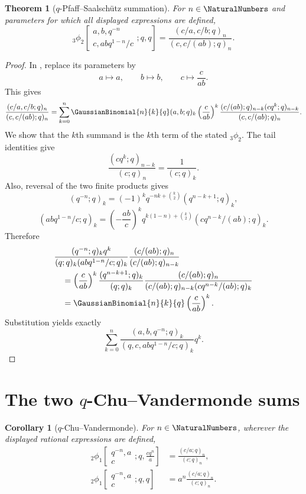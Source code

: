 \documentclass[11pt,a4paper,oneside,openany]{book}
\newtheorem{theorem}{Theorem}[chapter]
\newtheorem{corollary}[corollary]{Corollary}
\theoremstyle{definition}
\theoremstyle{remark}
\begin{document}
\begin{theorem}[$q$-Pfaff--Saalsch\"utz summation]\label{thm:q-pfaff}
For $n\in\NaturalNumbers$ and parameters for which all displayed
expressions are defined,
\[
 {}_3\phi_2\!\left[
 \begin{matrix}a,b,q^{-n}\\c,abq^{1-n}/c\end{matrix};q,q\right]
 =\frac{(c/a,c/b;q)_n}{(c,c/(ab);q)_n}.
\]
\end{theorem}

\begin{proof}
In , replace its parameters by
\[
 a\mapsto a,\qquad b\mapsto b,\qquad c\mapsto \frac{c}{ab}.
\]
This gives
\[
 \frac{(c/a,c/b;q)_n}{(c,c/(ab);q)_n}
 =\sum_{k=0}^{n}\GaussianBinomial{n}{k}{q}(a,b;q)_k
 \left(\frac{c}{ab}\right)^k
 \frac{(c/(ab);q)_{n-k}(cq^k;q)_{n-k}}
 {(c,c/(ab);q)_n}.
\]
We show that the $k$th summand is the $k$th term of the stated ${}_3\phi_2$.  The tail identities give
\[
 \frac{(cq^k;q)_{n-k}}{(c;q)_n}=\frac1{(c;q)_k}.
\]
Also, reversal of the two finite products gives
\[
 (q^{-n};q)_k
 =(-1)^kq^{-nk+\binom k2}(q^{n-k+1};q)_k,
\]
\[
 (abq^{1-n}/c;q)_k
 =\left(-\frac{ab}{c}\right)^k
 q^{k(1-n)+\binom k2}
 (cq^{n-k}/(ab);q)_k.
\]
Therefore
\begin{align*}
 &\frac{(q^{-n};q)_k q^k}{(q;q)_k(abq^{1-n}/c;q)_k}
 \frac{(c/(ab);q)_n}{(c/(ab);q)_{n-k}}\\
 &\quad=\left(\frac{c}{ab}\right)^k
 \frac{(q^{n-k+1};q)_k}{(q;q)_k}
 \frac{(c/(ab);q)_n}
 {(c/(ab);q)_{n-k}(cq^{n-k}/(ab);q)_k}\\
 &\quad=\GaussianBinomial{n}{k}{q}\left(\frac{c}{ab}\right)^k.
\end{align*}
Substitution yields exactly
\[
 \sum_{k=0}^{n}
 \frac{(a,b,q^{-n};q)_k}{(q,c,abq^{1-n}/c;q)_k}q^k.
\]
\end{proof}

\section{The two \texorpdfstring{$q$}{q}-Chu--Vandermonde sums}

\begin{corollary}[$q$-Chu--Vandermonde]\label{cor:q-chu}
For $n\in\NaturalNumbers$, wherever the displayed rational expressions are
defined,
\begin{align}
 {}_2\phi_1\!\left[
 \begin{matrix}q^{-n},a\\c\end{matrix};q,\frac{cq^n}{a}\right]
 &=\frac{(c/a;q)_n}{(c;q)_n},\label{eq:qchu1}\\
 {}_2\phi_1\!\left[
 \begin{matrix}q^{-n},a\\c\end{matrix};q,q\right]
 &=a^n\frac{(c/a;q)_n}{(c;q)_n}.
 \label{eq:qchu2}
\end{align}
\end{corollary}
\end{document}
